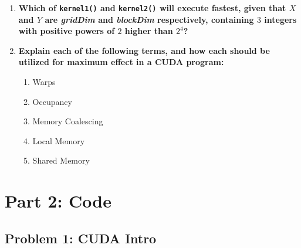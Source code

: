 \begin{enumerate}
\item \textbf{Which of \texttt{kernel1()} and \texttt{kernel2()} will execute fastest, given that $X$ and $Y$ are \textit{gridDim} and \textit{blockDim} respectively, containing $3$ integers with positive powers of $2$ higher than $2^4$?}

\item \textbf{Explain each of the following terms, and how each should be utilized for maximum effect in a CUDA program:}

\begin{enumerate}
\item Warps
\item Occupancy
\item Memory Coalescing
\item Local Memory
\item Shared Memory
\end{enumerate}

\end{enumerate}

\section*{Part 2: Code}

\subsection*{Problem 1: CUDA Intro}

